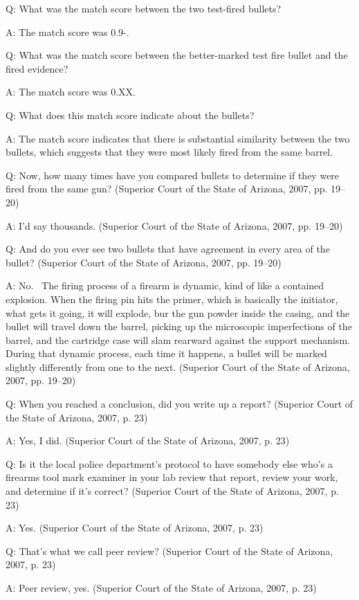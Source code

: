 \documentclass[print]{nuthesis}
\begin{document}
Q: What was the match score between the two test-fired bullets?

A: The match score was 0.9-.

Q: What was the match score between the better-marked test fire bullet and the fired evidence?

A: The match score was 0.XX.

Q: What does this match score indicate about the bullets?

A: The match score indicates that there is substantial similarity between the two bullets, which suggests that they were most likely fired from the same barrel.

Q: Now, how many times have you compared bullets to determine if they were fired from the same gun? (Superior Court of the State of Arizona, 2007, pp. 19--20)

A: I'd say thousands. (Superior Court of the State of Arizona, 2007, pp. 19--20)

Q: And do you ever see two bullets that have agreement in every area of the bullet? (Superior Court of the State of Arizona, 2007, pp. 19--20)

A: No.~
The firing process of a firearm is dynamic, kind of like a contained explosion.
When the firing pin hits the primer, which is basically the initiator, what gets it going, it will explode, bur the gun powder inside the casing, and the bullet will travel down the barrel, picking up the microscopic imperfections of the barrel, and the cartridge case will slam rearward against the support mechanism.
During that dynamic process, each time it happens, a bullet will be marked slightly differently from one to the next. (Superior Court of the State of Arizona, 2007, pp. 19--20)

Q: When you reached a conclusion, did you write up a report? (Superior Court of the State of Arizona, 2007, p. 23)

A: Yes, I did. (Superior Court of the State of Arizona, 2007, p. 23)

Q: Is it the local police department's protocol to have somebody else who's a firearms tool mark examiner in your lab review that report, review your work, and determine if it's correct? (Superior Court of the State of Arizona, 2007, p. 23)

A: Yes. (Superior Court of the State of Arizona, 2007, p. 23)

Q: That's what we call peer review? (Superior Court of the State of Arizona, 2007, p. 23)

A: Peer review, yes. (Superior Court of the State of Arizona, 2007, p. 23)
\end{document}
